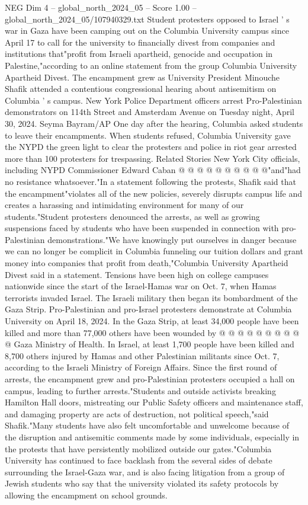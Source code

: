 \begin{textsample}{NEG Dim 4 – global\_north\_2024\_05 – Score 1.00 – global\_north\_2024\_05/107940329.txt}
Student protesters opposed to Israel ' s war in Gaza have been camping out on the Columbia University campus since April 17 to call for the university to financially divest from companies and institutions that"profit from Israeli apartheid, genocide and occupation in Palestine,"according to an online statement from the group Columbia University Apartheid Divest.
The encampment grew as University President Minouche Shafik attended a contentious congressional hearing about antisemitism on Columbia ' s campus.
New York Police Department officers arrest Pro-Palestinian demonstrators on 114th Street and Amsterdam Avenue on Tuesday night, April 30, 2024.
Seyma Bayram/AP One day after the hearing, Columbia asked students to leave their encampments.
When students refused, Columbia University gave the NYPD the green light to clear the protesters and police in riot gear arrested more than 100 protesters for trespassing.
Related Stories New York City officials, including NYPD Commissioner Edward Caban @ @ @ @ @ @ @ @ @ @"and"had no resistance whatsoever."In a statement following the protests, Shafik said that the encampment"violates all of the new policies, severely disrupts campus life and creates a harassing and intimidating environment for many of our students."Student protesters denounced the arrests, as well as growing suspensions faced by students who have been suspended in connection with pro-Palestinian demonstrations."We have knowingly put ourselves in danger because we can no longer be complicit in Columbia funneling our tuition dollars and grant money into companies that profit from death,"Columbia University Apartheid Divest said in a statement.
Tensions have been high on college campuses nationwide since the start of the Israel-Hamas war on Oct. 7, when Hamas terrorists invaded Israel.
The Israeli military then began its bombardment of the Gaza Strip.
Pro-Palestinian and pro-Israel protesters demonstrate at Columbia University on April 18, 2024.
In the Gaza Strip, at least 34,000 people have been killed and more than 77,000 others have been wounded by @ @ @ @ @ @ @ @ @ @ Gaza Ministry of Health.
In Israel, at least 1,700 people have been killed and 8,700 others injured by Hamas and other Palestinian militants since Oct. 7, according to the Israeli Ministry of Foreign Affairs.
Since the first round of arrests, the encampment grew and pro-Palestinian protesters occupied a hall on campus, leading to further arrests."Students and outside activists breaking Hamilton Hall doors, mistreating our Public Safety officers and maintenance staff, and damaging property are acts of destruction, not political speech,"said Shafik."Many students have also felt uncomfortable and unwelcome because of the disruption and antisemitic comments made by some individuals, especially in the protests that have persistently mobilized outside our gates."Columbia University has continued to face backlash from the several sides of debate surrounding the Israel-Gaza war, and is also facing litigation from a group of Jewish students who say that the university violated its safety protocols by allowing the encampment on school grounds.

\end{textsample}
